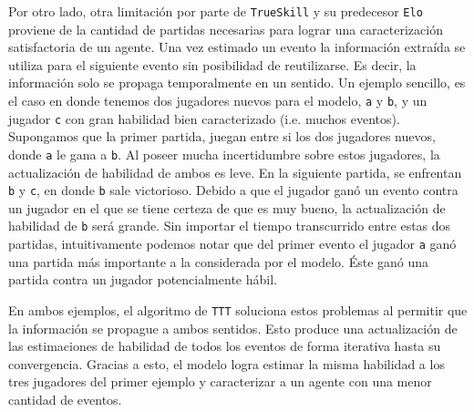 \documentclass[11pt,twoside,spanish]{report} %
\begin{document}
Por otro lado, otra limitaci\'on por parte de \texttt{TrueSkill} y su predecesor \texttt{Elo} proviene de la cantidad de partidas necesarias para lograr una caracterizaci\'on satisfactoria de un agente.
Una vez estimado un evento la informaci\'on extra\'ida se utiliza para el siguiente evento sin posibilidad de reutilizarse.
Es decir, la informaci\'on solo se propaga temporalmente en un sentido.
Un ejemplo sencillo, es el caso en donde tenemos dos jugadores nuevos para el modelo, \texttt{a} y \texttt{b}, y un jugador \texttt{c} con gran habilidad bien caracterizado (i.e. muchos eventos).
Supongamos que la primer partida, juegan entre si los dos jugadores nuevos, donde \texttt{a} le gana a  \texttt{b}.
Al poseer mucha incertidumbre sobre estos jugadores, la actualizaci\'on de habilidad de ambos es leve.
En la siguiente partida, se enfrentan \texttt{b} y \texttt{c}, en donde \texttt{b}  sale victorioso. 
Debido a que el jugador gan\'o un evento contra un jugador en el que se tiene certeza de que es muy bueno, la actualizaci\'on de habilidad de \texttt{b} ser\'a grande.
Sin importar el tiempo transcurrido entre estas dos partidas, intuitivamente podemos notar que del primer evento el jugador  \texttt{a}  gan\'o una partida m\'as importante a la considerada por el modelo.
\'Este gan\'o una partida contra un jugador potencialmente h\'abil.

En  ambos ejemplos, el algoritmo de \texttt{TTT} soluciona estos problemas al permitir que la informaci\'on se propague a ambos sentidos.
Esto produce una actualizaci\'on de las estimaciones de habilidad de todos los eventos de forma iterativa hasta su convergencia.
Gracias a esto, el modelo logra estimar la misma habilidad a los tres jugadores del primer ejemplo y caracterizar a un agente con una menor cantidad de eventos.

% 
% 
% 
% 
\end{document}
